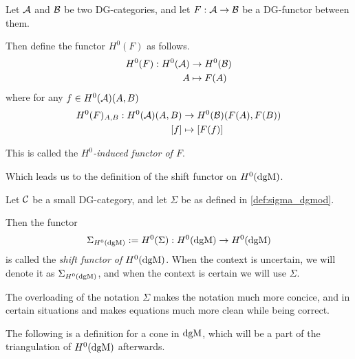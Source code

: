 \begin{definition}
    \label{def:H^0-induced_functor}
    Let \( {\mathcal{A}} \) and \( {\mathcal{B}} \) be two DG-categories, and let \( F: {\mathcal{A}} \to {\mathcal{B}} \) be a DG-functor between them.

    Then define the functor \( H^0(F) \) as follows.
    \begin{align*}
        H^0(F): H^0({\mathcal{A}}) &\to H^0({\mathcal{B}}) \\
        A &\mapsto F(A)
    \end{align*}
    where for any \( f \in H^0({\mathcal{A}})(A, B) \)
    \begin{align*}
        H^0(F)_{A, B}: H^0({\mathcal{A}})(A, B) &\to H^0({\mathcal{B}})(F(A), F(B)) \\
        [f] &\mapsto [F(f)]
    \end{align*}

    This is called the \emph{\( H^0 \)-induced functor of \( F \)}.
\end{definition}

Which leads us to the definition of the shift functor on \( H^0(\operatorname{dgM}) \).

\begin{definition}
    \label{def:sigma_h_0_dgmod}
    Let \( {\mathcal{C}} \) be a small DG-category, and let \( \Sigma \) be as defined in \autoref{def:sigma_dgmod}.

    Then the functor
    \[
        \Sigma_{H^0(\operatorname{dgM})} := H^0(\Sigma): H^0(\operatorname{dgM}) \to H^0(\operatorname{dgM})
    \]
    is called the \emph{shift functor of \( H^0(\operatorname{dgM}) \)}. When the context is uncertain, we will denote it as \( \Sigma_{H^0(\operatorname{dgM})} \), and when the context is certain we will use \( \Sigma \).
\end{definition}

The overloading of the notation \( \Sigma \) makes the notation much more concice, and in certain situations and makes equations much more clean while being correct.

The following is a definition for a cone in \( \operatorname{dgM} \), which will be a part of the triangulation of \( H^0(\operatorname{dgM}) \) afterwards.


